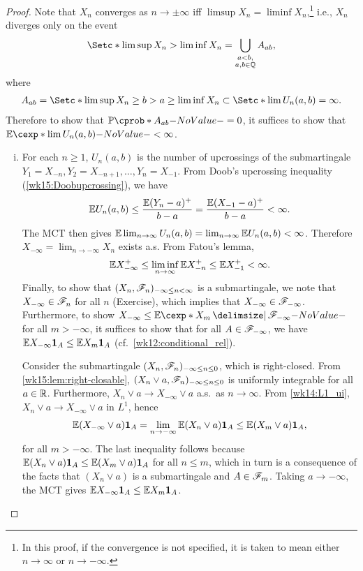 \documentclass[12pt]{article}
\begin{document}
\begin{proof}
Note that $X_n$ converges as $n\to\pm\infty$ iff $\limsup X_n = \liminf X_n$,\footnote{In this proof, if the convergence is not specified, it is taken to mean either $n\to\infty$ or $n\to-\infty$.} i.e., $X_n$ diverges only on the event
\begin{align*}
\set*{\limsup X_n > \liminf X_n} = \bigcup_{\substack{a < b,\\ a,b\in\bbQ}} A_{ab},
\end{align*}
where
\begin{align*}
A_{ab} = \set*{\limsup X_n \geq b > a \geq \liminf X_n} \subset \set*{\lim U_n(a,b) = \infty}.
\end{align*}
Therefore to show that $\P(A_{ab})=0$, it suffices to show that $\E[\lim U_n(a,b)] < \infty$.

\begin{enumerate}[(i)]
	\item For each $n\geq1$, $U_n(a,b)$ is the number of upcrossings of the submartingale $Y_1=X_{-n}, Y_2=X_{-n+1}, \ldots, Y_n=X_{-1}$. From Doob's upcrossing inequality (\cref{wk15:Doobupcrossing}), we have
	\begin{align*}
	\E U_n(a,b) \leq \frac{\E(Y_n-a)^+}{b-a} = \frac{\E(X_{-1}-a)^+}{b-a} < \infty.
	\end{align*}
	The MCT then gives $\E\lim_{n\to\infty} U_n(a,b) = \lim_{n\to\infty} \E U_n(a,b) < \infty$. Therefore $X_{-\infty}=\lim_{n\to-\infty} X_n$ exists a.s. From Fatou's lemma, 
	\begin{align*}
	\E X_{-\infty}^+ \leq \liminf_{n\to\infty} \E X_{-n}^+ \leq \E X_{-1}^+ <\infty.
	\end{align*}
	Finally, to show that $(X_n,\mathscr{F}_n)_{-\infty\leq n<\infty}$ is a submartingale, we note that $X_{-\infty}\in\mathscr{F}_n$ for all $n$ (Exercise), which implies that $X_{-\infty}\in\mathscr{F}_{-\infty}$. Furthermore, to show $X_{-\infty} \leq \E[ X_m \given \scF_{-\infty}]$ for all $m>-\infty$, it suffices to show that for all $A\in\mathscr{F}_{-\infty}$, we have $\E X_{-\infty}\indicatore{A} \leq \E X_m\indicatore{A}$ (cf.\ \cref{wk12:conditional_rel}).
	
	Consider the submartingale $(X_n,\mathscr{F}_n)_{-\infty\leq n\leq 0}$, which is right-closed. From \cref{wk15:lem:right-closable}, $(X_n\vee a,\mathscr{F}_n)_{-\infty\leq n\leq 0}$ is uniformly integrable for all $a\in\mathbb{R}$. Furthermore, $X_n\vee a \to X_{-\infty}\vee a$ a.s.\ as $n\to\infty$. From \cref{wk14:L1_ui}, $X_n\vee a \to X_{-\infty}\vee a$ in $L^1$, hence
	\begin{align*}
	\E (X_{-\infty}\vee a)\indicatore{A} = \lim_{n\to-\infty} \E (X_n\vee a)\indicatore{A} \leq \E(X_m\vee a)\indicatore{A},
	\end{align*}
	for all $m>-\infty$. The last inequality follows because $\E (X_n\vee a)\indicatore{A} \leq \E(X_m\vee a)\indicatore{A}$ for all $n\leq m$, which in turn is a consequence of the facts that $(X_n\vee a)$ is a submartingale and $A\in\mathscr{F}_m$. Taking $a\to-\infty$, the MCT gives $\E X_{-\infty}\indicatore{A} \leq \E X_m\indicatore{A}$.
	

\end{enumerate}
\end{proof}
\end{document}
